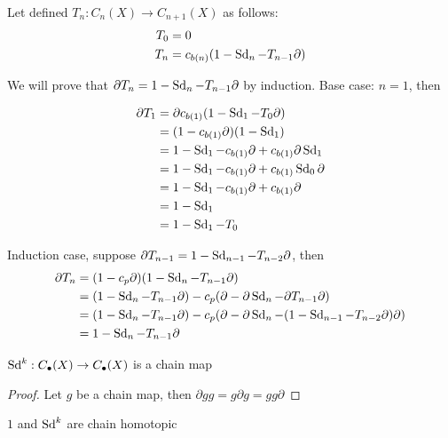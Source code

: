 \documentclass{report}
\begin{document}
\begin{longproof}
    Let defined $T_n: C_n(X) \to C_{n+1}(X)$ as follows:
    \begin{align*}
        T_0 &= 0 \\
        T_n &= c_{b(n)}(1 - \operatorname{Sd}_n - T_{n-1} \partial)
    \end{align*}
    
    We will prove that $\partial T_n = 1 - \operatorname{Sd}_n - T_{n-1} \partial$ by induction. Base case: $n = 1$, then

    \begin{align*}
        \partial T_1
        &= \partial c_{b(1)}(1 - \operatorname{Sd}_1 - T_0 \partial) \\
        &= (1 - c_{b(1)} \partial) (1 - \operatorname{Sd}_1) \\
        &= 1 - \operatorname{Sd}_1 - c_{b(1)} \partial + c_{b(1)} \partial \operatorname{Sd}_1 \\
        &= 1 - \operatorname{Sd}_1 - c_{b(1)} \partial + c_{b(1)} \operatorname{Sd}_0 \partial  \\
        &= 1 - \operatorname{Sd}_1 - c_{b(1)} \partial + c_{b(1)} \partial \\
        &= 1 - \operatorname{Sd}_1 \\
        &= 1 - \operatorname{Sd}_1 - T_0
    \end{align*}
    
    Induction case, suppose $\partial T_{n-1} = 1 - \operatorname{Sd}_{n-1} - T_{n-2} \partial$, then
    \begin{align*}
        \partial T_n
        &= (1 - c_p \partial) (1 - \operatorname{Sd}_n - T_{n-1} \partial) \\
        &= (1 - \operatorname{Sd}_n - T_{n-1} \partial) - c_p (\partial - \partial \operatorname{Sd}_n - \partial T_{n-1} \partial) \\
        &= (1 - \operatorname{Sd}_n - T_{n-1} \partial) - c_p (\partial - \partial \operatorname{Sd}_n - (1 - \operatorname{Sd}_{n-1} - T_{n-2} \partial) \partial) \\
        &= 1 - \operatorname{Sd}_n - T_{n-1} \partial \\
    \end{align*}
\end{longproof}

\begin{proposition}
    $\operatorname{Sd}^k: C_\bullet(X) \to C_\bullet(X)$ is a chain map
\end{proposition}

\begin{proof}
    Let $g$ be a chain map, then $\partial gg = g \partial g = gg \partial$
\end{proof}

\begin{corollary}
    $1$ and $\operatorname{Sd}^k$ are chain homotopic
\end{corollary}
\end{document}
